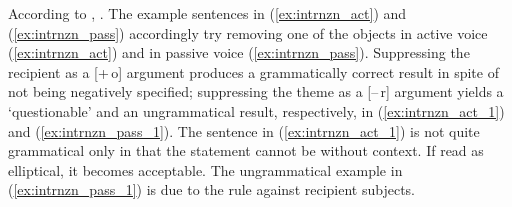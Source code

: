 According to \citet{bresnan2016}, . The example sentences in
(\ref{ex:intrnzn_act}) and (\ref{ex:intrnzn_pass}) accordingly try removing one
of the objects in active voice (\ref{ex:intrnzn_act}) and in passive voice
(\ref{ex:intrnzn_pass}). Suppressing the recipient as a [+\,o] argument
produces a grammatically correct result in spite of not being negatively
specified; suppressing the theme as a \mbox{[–\,r]} argument yields a
`questionable' and an ungrammatical result, respectively, in
(\ref{ex:intrnzn_act_1}) and (\ref{ex:intrnzn_pass_1}). The sentence in
(\ref{ex:intrnzn_act_1}) is not quite grammatical only in that the statement
cannot be without context. If read as elliptical, it becomes acceptable. The
ungrammatical example in (\ref{ex:intrnzn_pass_1}) is due to the rule against
recipient subjects.

